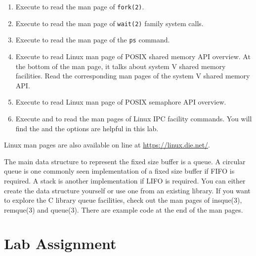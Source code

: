\begin{enumerate}
\item Execute  to read the man page of \verb+fork(2)+.
\item Execute  to read the man page of \verb+wait(2)+ family system calls.
\item Execute  to read the man page of the \verb+ps+ command.
\item Execute  to read Linux man page of POSIX shared memory API overview. At the bottom of the man page, it talks about system V shared memory facilities. Read the corresponding man pages of the system V shared memory API.
\item Execute  to read Linux man page of POSIX semaphore API overview.
\item Execute  and  to read the man pages of Linux IPC facility commands. You will find the  and the  options are helpful in this lab.  
\end{enumerate}
Linux man pages are also available on line at \url{https://linux.die.net/}.

The main data structure to represent the fixed size buffer is a queue. A circular queue is one commonly seen implementation of a fixed size buffer if FIFO is required. A stack is another implementation if LIFO is required. You can either create the data structure yourself or use one from an existing library. If you want to explore the C library queue facilities, check out the man pages of insque(3), remque(3) and queue(3). There are example code at the end of the man pages.

\section{Lab Assignment}
